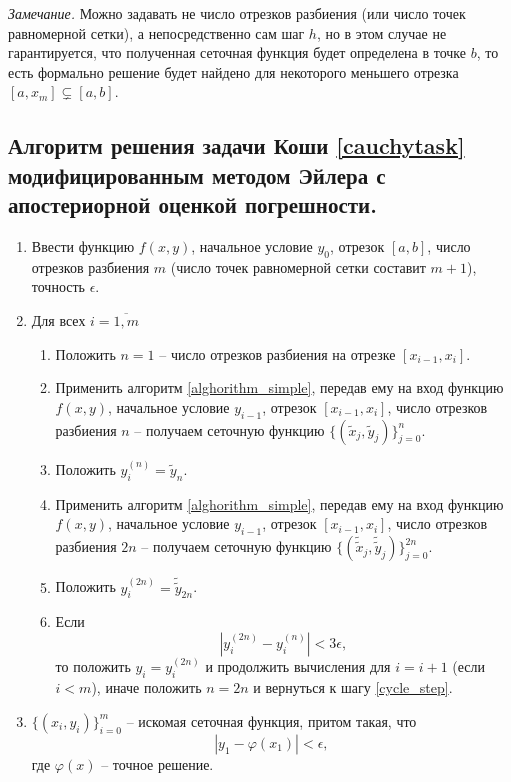 \documentclass[a4paper, 12pt]{article}
\begin{document}
	\textit{Замечание.} Можно задавать не число отрезков разбиения (или число точек равномерной сетки), а непосредственно сам шаг $h$, но в этом случае не гарантируется, что полученная сеточная функция будет определена в точке $b$, то есть формально решение будет найдено для некоторого меньшего отрезка ${[a,x_m] \varsubsetneq [a,b]}$.
	
	\subsection{Алгоритм решения задачи Коши \eqref{cauchytask} модифицированным методом Эйлера с апостериорной оценкой погрешности.} \label{alghorithm_runge}
	
	\begin{enumerate}
		\item Ввести функцию $f(x,y)$, начальное условие $y_0$, отрезок $[a,b]$, число отрезков разбиения $m$ (число точек равномерной сетки составит $m+1$), точность $\epsilon$.
		\item Для всех $i=\overline{1,m}$
		\begin{enumerate}
			\item Положить $n=1$ -- число отрезков разбиения на отрезке $[x_{i-1},x_i]$.
			\item Применить алгоритм \ref{alghorithm_simple}, передав ему на вход функцию $f(x,y)$, начальное условие $y_{i-1}$, отрезок $[x_{i-1}, x_{i}]$, число отрезков разбиения $n$ -- получаем сеточную функцию $\{(\widetilde{x}_j,\widetilde{y}_j)\}_{j=0}^n$.
			\item Положить $y_i^{(n)}=\widetilde{y}_n$.
			\item Применить алгоритм \ref{alghorithm_simple}, передав ему на вход функцию $f(x,y)$, начальное условие $y_{i-1}$, отрезок $[x_{i-1}, x_{i}]$, число отрезков разбиения $2n$ -- получаем сеточную функцию $\{(\widetilde{\widetilde{x}}_j,\widetilde{\widetilde{y}}_j)\}_{j=0}^{2n}$. \label{cycle_step}
			\item Положить $y_i^{(2n)}=\widetilde{\widetilde{y}}_{2n}$.
			\item Если
			\begin{equation}
				|y_i^{(2n)}-y_i^{(n)}| < 3\epsilon,
			\end{equation}
			то положить $y_i=y_i^{(2n)}$ и продолжить вычисления для $i=i+1$ (если $i<m$), иначе положить $n=2n$ и вернуться к шагу \ref{cycle_step}.
		\end{enumerate}
		\item $\{(x_i,y_i)\}_{i=0}^m$ -- искомая сеточная функция, притом такая, что
		\begin{equation}
			|y_1-\varphi(x_1)|<\epsilon,
		\end{equation}
		где $\varphi(x)$ -- точное решение.
	\end{enumerate}
\end{document}
